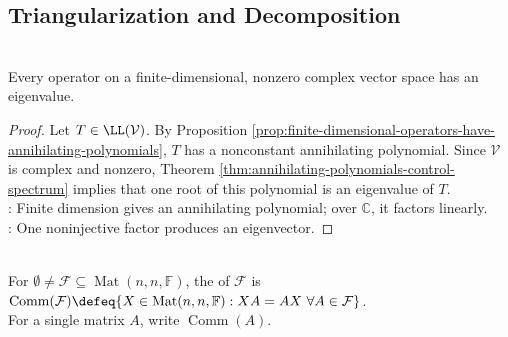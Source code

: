 \subsection{Triangularization and Decomposition}

\begin{theorem} \label{thm:complex-operator-has-eigenvalue} \\
Every operator on a finite-dimensional, nonzero complex vector space has an eigenvalue.
\begin{proof}
Let $T\in\LL(\mathcal{V})$. By Proposition \ref{prop:finite-dimensional-operators-have-annihilating-polynomials}, $T$ has a nonconstant annihilating polynomial. Since $\mathcal{V}$ is complex and nonzero, Theorem \ref{thm:annihilating-polynomials-control-spectrum} implies that one root of this polynomial is an eigenvalue of $T$.\\
: Finite dimension gives an annihilating polynomial; over $\mathbb{C}$, it factors linearly.\\
: One noninjective factor produces an eigenvector.
\end{proof}
\end{theorem}

\begin{definition} \label{def:matrix-commutant} \\
For $\emptyset\neq\mathcal{F}\subseteq\operatorname{Mat}(n,n,\mathbb{F})$, the  of $\mathcal{F}$ is $\operatorname{Comm}(\mathcal{F})\defeq\{X\in\operatorname{Mat}(n,n,\mathbb{F}): XA=AX\ \forall A\in\mathcal{F}\}$.\\
For a single matrix $A$, write $\operatorname{Comm}(A)$.
\end{definition}


